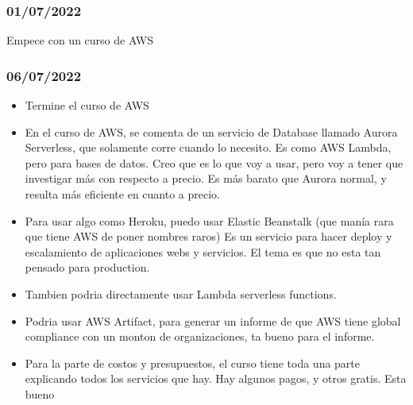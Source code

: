 \documentclass[../informe_krapp.tex]{subfiles}
\begin{document}
\subsubsection*{01/07/2022}
Empece con un curso de AWS

\subsubsection*{06/07/2022}
\begin{itemize}
	\item Termine el curso de AWS
	\item En el curso de AWS, se comenta de un servicio de Database llamado Aurora Serverless, que solamente corre cuando lo necesito.
	      Es como AWS Lambda, pero para bases de datos. Creo que es lo que voy a usar, pero voy a tener que investigar más con respecto a precio.
	      Es más barato que Aurora normal, y resulta más eficiente en cuanto a precio.
	\item Para usar algo como Heroku, puedo usar Elastic Beanstalk (que manía rara que tiene AWS de poner nombres raros)
	      Es un servicio para hacer deploy y escalamiento de aplicaciones webs y servicios. El tema es que no esta tan pensado para production.
	\item Tambien podria directamente usar Lambda serverless functions.
	\item Podria usar AWS Artifact, para generar un informe de que AWS tiene global compliance con un monton de organizaciones, ta bueno
	      para el informe.
	\item Para la parte de costos y presupuestos, el curso tiene toda una parte explicando todos los servicios que hay. Hay algunos pagos,
	      y otros gratis. Esta bueno
\end{itemize}
\end{document}
